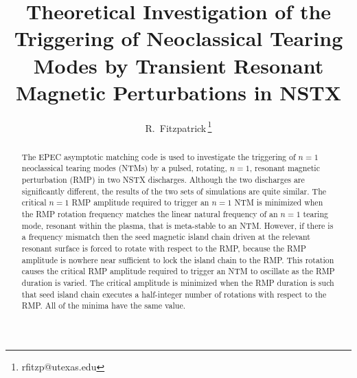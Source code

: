 \documentclass[12pt,prb,aps]{revtex4-1}
\begin{document}
\title{Theoretical Investigation of the Triggering of Neoclassical Tearing Modes by Transient Resonant Magnetic Perturbations in NSTX}
\author{R.~Fitzpatrick\,\footnote{rfitzp@utexas.edu}}

\begin{abstract}
The EPEC asymptotic matching code is used to investigate the triggering of $n=1$ neoclassical tearing modes (NTMs) by a pulsed, 
rotating, $n=1$, resonant magnetic perturbation (RMP)  in
two NSTX discharges. Although the two discharges are significantly different, the results of the two sets of simulations are quite similar. The critical $n=1$ RMP  amplitude required to
trigger an $n=1$ NTM is minimized when the RMP rotation frequency matches the linear natural frequency of an $n=1$  tearing mode, resonant within the plasma, that is meta-stable to an NTM. However, if there is a frequency mismatch then the seed magnetic island chain driven at the relevant resonant surface is forced to rotate with respect to the RMP, because the RMP amplitude is nowhere near sufficient to lock the island chain to the RMP.  
This rotation causes the critical RMP amplitude required to trigger an NTM to oscillate as the RMP duration is varied. The critical amplitude is
minimized when the RMP duration is such that  seed island chain executes a half-integer number of rotations with respect to the RMP. All of the minima have the same value. 
\end{abstract}

\maketitle
\end{document}
